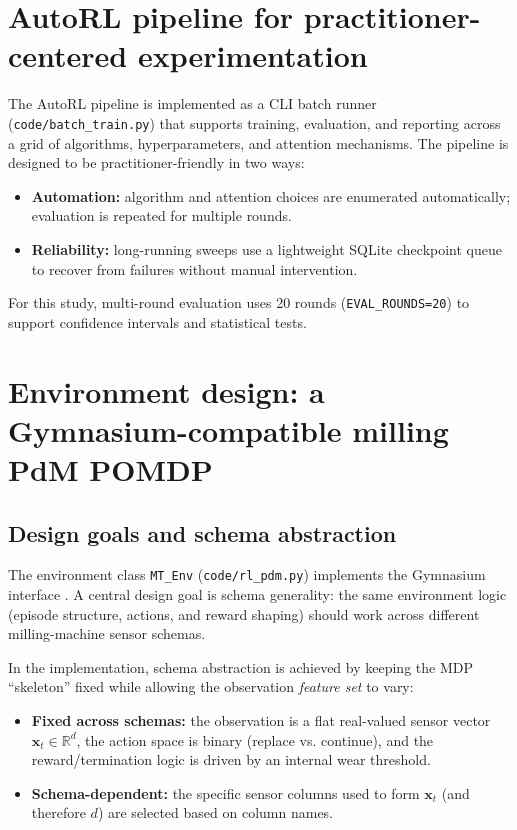 \documentclass[refree,sn-basic]{sn-jnl} %
\begin{document}
\section{AutoRL pipeline for practitioner-centered experimentation}
\label{sec:autorl}
The AutoRL pipeline is implemented as a CLI batch runner (\texttt{code/batch\_train.py}) that supports training, evaluation, and reporting across a grid of algorithms, hyperparameters, and attention mechanisms. The pipeline is designed to be practitioner-friendly in two ways:
\begin{itemize}
        \item \textbf{Automation:} algorithm and attention choices are enumerated automatically; evaluation is repeated for multiple rounds.
        \item \textbf{Reliability:} long-running sweeps use a lightweight SQLite checkpoint queue to recover from failures without manual intervention.
\end{itemize}
For this study, multi-round evaluation uses 20 rounds (\texttt{EVAL\_ROUNDS=20}) to support confidence intervals and statistical tests.

\section{Environment design: a Gymnasium-compatible milling PdM POMDP}
\label{sec:env}
\subsection{Design goals and schema abstraction}
The environment class \texttt{MT\_Env} (\texttt{code/rl\_pdm.py}) implements the Gymnasium interface \cite{Gymnasium2023}. A central design goal is schema generality: the same environment logic (episode structure, actions, and reward shaping) should work across different milling-machine sensor schemas.

In the implementation, schema abstraction is achieved by keeping the MDP ``skeleton'' fixed while allowing the observation \emph{feature set} to vary:
\begin{itemize}
        \item \textbf{Fixed across schemas:} the observation is a flat real-valued sensor vector $\mathbf{x}_t\in\mathbb{R}^d$, the action space is binary (replace vs. continue), and the reward/termination logic is driven by an internal wear threshold.
        \item \textbf{Schema-dependent:} the specific sensor columns used to form $\mathbf{x}_t$ (and therefore $d$) are selected based on column names.
\end{itemize}
\end{document}
